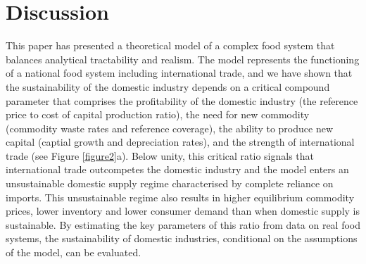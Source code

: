 \documentclass[12pt]{article}
\begin{document}
\section{Discussion}
This paper has presented a theoretical model of a complex food system that balances analytical tractability and realism. The model represents the functioning of a national food system including international trade, and we have shown that the sustainability of the domestic industry depends on a critical compound parameter that comprises the profitability of the domestic industry (the reference price to cost of capital production ratio), the need for new commodity (commodity waste rates and reference coverage), the ability to produce new capital (captial growth and depreciation rates), and the strength of international trade (see Figure \ref{figure2}a). Below unity, this critical ratio signals that international trade outcompetes the domestic industry and the model enters an unsustainable domestic supply regime characterised by complete reliance on imports. This unsustainable regime also results in higher equilibrium commodity prices, lower inventory and lower consumer demand than when domestic supply is sustainable. By estimating the key parameters of this ratio from data on real food systems, the sustainability of domestic industries, conditional on the assumptions of the model, can be evaluated.
\end{document}
